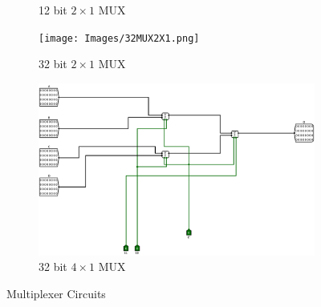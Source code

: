 \documentclass[12pt]{article}
\begin{document}
\begin{figure}[H]
\begin{subfigure}[b]{0.3\textwidth}
        \caption{12 bit $2\times1$ MUX}
        \label{fig:12b2x1}
    \end{subfigure}
    \newline
    \newline
    \begin{subfigure}[b]{0.45\textwidth}
        \texttt{[image: Images/32MUX2X1.png]}
        \caption{32 bit $2\times1$ MUX}
        \label{fig:32b2x1}
    \end{subfigure}
    \begin{subfigure}[b]{0.45\textwidth}
        \includegraphics[width=\textwidth]{Images/32MUX4X1.png}
        \caption{32 bit $4\times1$ MUX}
        \label{fig:32b4x1}
    \end{subfigure}
    \caption{Multiplexer Circuits}\label{fig:mux}
\end{figure}
\end{document}
